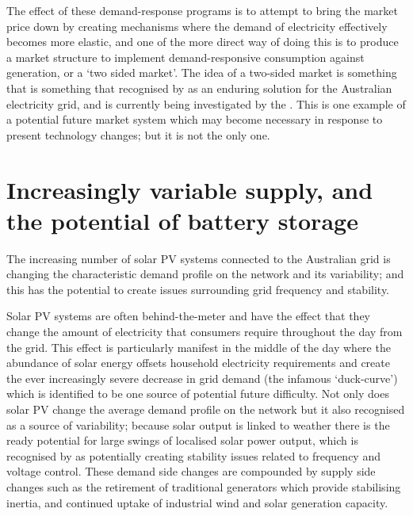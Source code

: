 The effect of these demand-response programs is to attempt to bring the market price down by creating mechanisms where the demand of electricity effectively becomes more elastic, and one of the more direct way of doing this is to produce a market structure to implement demand-responsive consumption against generation, or a `two sided market'.
The idea of a two-sided market is something that is something that recognised by \cite{australianenergymarketcommission2020} as an enduring solution for the Australian electricity grid, and is currently being investigated by the \cite{energysecurityboard2020}.
This is one example of a potential future market system which may become necessary in response to present technology changes; but it is not the only one.

\section{Increasingly variable supply, and the potential of battery storage}

The increasing number of solar PV systems connected to the Australian grid is changing the characteristic demand profile on the network and its variability; and this has the potential to create issues surrounding grid frequency and stability.

Solar PV systems are often behind-the-meter and have the effect that they change the amount of electricity that consumers require throughout the day from the grid.
This effect is particularly manifest in the middle of the day where the abundance of solar energy offsets household electricity requirements and create the ever increasingly severe decrease in grid demand (the infamous `duck-curve') which is identified to be one source of potential future difficulty.
Not only does solar PV change the average demand profile on the network but it also recognised as a source of variability; because solar output is linked to weather there is the ready potential for large swings of localised solar power output, which is recognised by \cite{australianenergymarketoperatorlimited2018} as potentially creating stability issues related to frequency and voltage control.
These demand side changes are compounded by supply side changes such as the retirement of traditional generators which provide stabilising inertia, and continued uptake of industrial wind and solar generation capacity.

